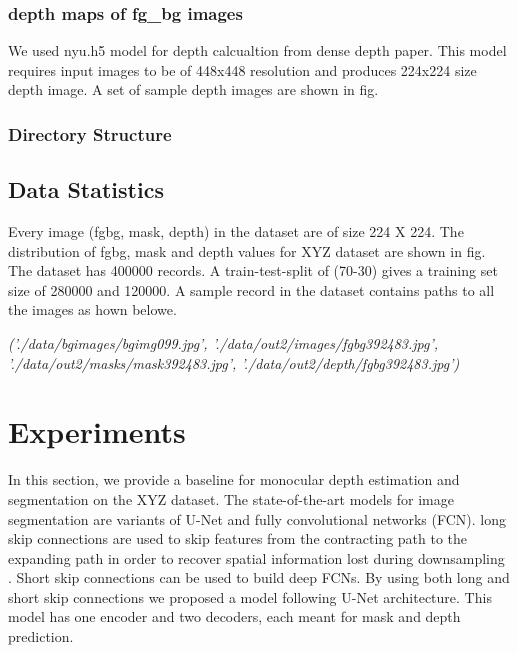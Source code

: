 \documentclass{article}
\begin{document}
\subsubsection{depth maps of fg\_bg images}
We used nyu.h5 model for depth calcualtion from dense depth paper. This model requires input images to be of 448x448 resolution and produces 224x224 size depth image. A set of sample depth images are shown in fig.

\subsubsection{Directory Structure}


\subsection{Data Statistics}
Every image (fgbg, mask, depth) in the dataset are of size 224 X 224. The distribution of fgbg, mask and depth values for XYZ dataset are shown in fig. The dataset has 400000 records. A train-test-split of (70-30) gives a training set size of 280000 and 120000. A sample record in the dataset contains paths to all the images as hown belowe.

\textit{('./data/bgimages/bgimg099.jpg', 
'./data/out2/images/fgbg392483.jpg', 
'./data/out2/masks/mask392483.jpg', 
'./data/out2/depth/fgbg392483.jpg')}

\section{Experiments}
In this section, we provide a baseline for monocular depth estimation and segmentation on the XYZ dataset. 
The state-of-the-art models for image segmentation are variants of U-Net and fully convolutional networks (FCN)\cite{drozdzal2016importance}. long skip connections are used to skip features from the contracting path to the expanding path in order to recover spatial information lost during downsampling \cite{zhou2019unet++}. Short skip connections can be used to build deep FCNs. By using both long and short skip connections we proposed a model following U-Net architecture. This model has one encoder and two decoders, each meant for mask and depth prediction.
\end{document}
